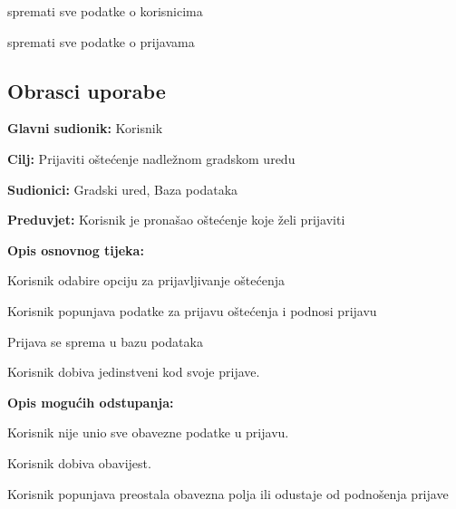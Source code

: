 \begin{packed_enum}
				\item  {}
				\begin{packed_enum}
					\item spremati sve podatke o korisnicima
					\item spremati sve podatke o prijavama
				\end{packed_enum}
				
			\end{packed_enum}
						
			\eject 
			
			\subsection{Obrasci uporabe}

					\noindent {}
					\begin{packed_item}
	
						\item \textbf{Glavni sudionik:} Korisnik
						\item  \textbf{Cilj:} Prijaviti oštećenje nadležnom gradskom uredu
						\item  \textbf{Sudionici:} Gradski ured, Baza podataka
						\item  \textbf{Preduvjet:} Korisnik je pronašao oštećenje koje želi prijaviti
						
						\item  \textbf{Opis osnovnog tijeka:}
						\item[] \begin{packed_enum}
							\item Korisnik odabire opciju za prijavljivanje oštećenja
							\item Korisnik popunjava podatke za prijavu oštećenja i podnosi prijavu
							\item Prijava se sprema u bazu podataka
							\item Korisnik dobiva jedinstveni kod svoje prijave.
						\end{packed_enum}
						
						\item  \textbf{Opis mogućih odstupanja:}
						\item[] \begin{packed_item}
							\item[2.a] Korisnik nije unio sve obavezne podatke u prijavu.
							\item[] \begin{packed_enum}
								\item Korisnik dobiva obavijest.
								\item Korisnik popunjava preostala obavezna polja ili odustaje od podnošenja prijave
							\end{packed_enum}
							
						\end{packed_item}
					\end{packed_item}
					
